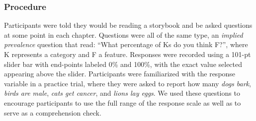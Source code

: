 \documentclass[10pt,letterpaper]{article}
\newcommand\Tstrut{\rule{0pt}{2.6ex}}       %
\newcommand\Bstrut{\rule[-1ex]{0pt}{0pt}} %
\newcommand{\TBstrut}{\Tstrut\Bstrut} %
\begin{document}


\subsubsection{Procedure}
Participants were told they would be reading a storybook and be asked questions at some point in each chapter. 
Questions were all of the same type, an \emph{implied prevalence} question \cite{Gelman2002, Cimpian2010} that read: ``What percentage of Ks do you think F?'', where K represents a category and F a feature. 
Responses were recorded using a 101-pt slider bar with end-points labeled 0\% and 100\%, with the exact value selected appearing above the slider. 
Participants were familiarized with the response variable in a practice trial, where they were asked to report how many \emph{dogs bark}, \emph{birds are male}, \emph{cats get cancer}, and \emph{lions lay eggs}. 
We used these questions to encourage participants to use the full range of the response scale as well as to serve as a comprehension check. 
\end{document}
